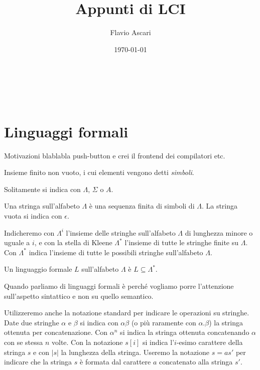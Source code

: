 \documentclass[12pt]{article}
\title{Appunti di LCI}\let\Title\@title
\author{Flavio Ascari}\let\Author\@author
\date{\today}\let\Date\@date
\numberwithin{theorem}{subsection}
\begin{document}
\begin{center}
	\vspace*{0,5 cm}
	{\Huge \textsc{\Title}} \\
	\vspace{0,5 cm}
	\textsc{\Author} \
	\textsc{\Date}
	\thispagestyle{empty}
	\vspace{0,7 cm}
\end{center}
\small

\tableofcontents
\clearpage

\section{Linguaggi formali}
Motivazioni blablabla push-button e crei il frontend dei compilatori etc.

\begin{definition}[Alfabeto]
	Insieme finito non vuoto, i cui elementi vengono detti \textit{simboli}.
\end{definition}
Solitamente si indica con $\Lambda$, $\Sigma$ o $A$.
\begin{definition}[Stringa]
	Una stringa sull'alfabeto $\Lambda$ è una sequenza finita di simboli di $\Lambda$. La stringa vuota si indica con $\epsilon$.
\end{definition}
Indicheremo con $\Lambda^i$ l'insieme delle stringhe sull'alfabeto $\Lambda$ di lunghezza minore o uguale a $i$, e con la stella di Kleene $\Lambda^*$ l'insieme di tutte le stringhe finite su $\Lambda$. 
Con $\Lambda^*$ indica l'insieme di tutte le possibili stringhe sull'alfabeto $\Lambda$.
\begin{definition}
	Un linguaggio formale $L$ sull'alfabeto $\Lambda$ è $L \subseteq \Lambda^*$.
\end{definition}
Quando parliamo di linguaggi formali è perché vogliamo porre l'attenzione sull'aspetto sintattico e non su quello semantico.

Utilizzeremo anche la notazione standard per indicare le operazioni su stringhe. Date due stringhe $\alpha$ e $\beta$ si indica con $\alpha \beta$ (o più raramente con $\alpha . \beta$) la stringa ottenuta per concatenazione. Con $\alpha^n$ si indica la stringa ottenuta concatenando $\alpha$ con se stessa $n$ volte. Con la notazione $s[i]$ si indica l'$i$-esimo carattere della stringa $s$ e con $\vert s \vert$ la lunghezza della stringa. Useremo la notazione $s = as'$ per indicare che la stringa $s$ è formata dal carattere $a$ concatenato alla stringa $s'$.
\end{document}
